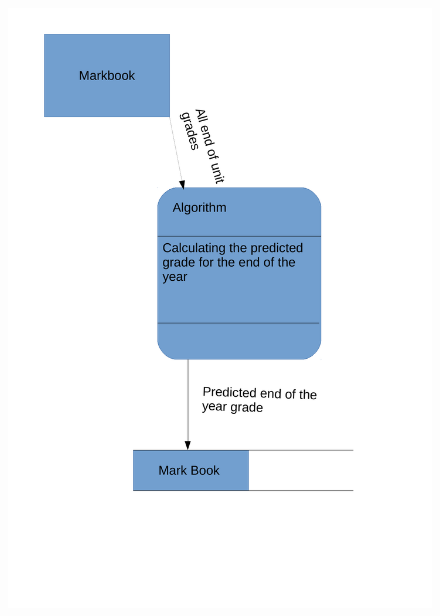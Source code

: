 \begin{algorithm}[H]
\begin{figure}[H]
    \includegraphics[width=\textwidth]{./Analysis/images/DataFlowDiagrams2.pdf}
\end{figure}


\end{algorithm}
